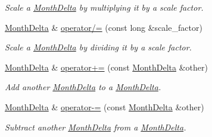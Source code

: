 \begin{DoxyCompactItemize}
\begin{DoxyCompactList}\small\item\em Scale a \hyperlink{structMonthDelta}{Month\-Delta} by multiplying it by a scale factor. \end{DoxyCompactList}\item 
\hyperlink{structMonthDelta}{Month\-Delta} \& \hyperlink{structMonthDelta_a1c88e61ee94308ced34e8d73d13bc383}{operator/=} (const long \&scale\-\_\-factor)
\begin{DoxyCompactList}\small\item\em Scale a \hyperlink{structMonthDelta}{Month\-Delta} by dividing it by a scale factor. \end{DoxyCompactList}\item 
\hyperlink{structMonthDelta}{Month\-Delta} \& \hyperlink{structMonthDelta_aa244bc614894a3daaf8d71f0c9c6202b}{operator+=} (const \hyperlink{structMonthDelta}{Month\-Delta} \&other)
\begin{DoxyCompactList}\small\item\em Add another \hyperlink{structMonthDelta}{Month\-Delta} to a \hyperlink{structMonthDelta}{Month\-Delta}. \end{DoxyCompactList}\item 
\hyperlink{structMonthDelta}{Month\-Delta} \& \hyperlink{structMonthDelta_ad62de2e3686f5b93088eb371e9ff4c87}{operator-\/=} (const \hyperlink{structMonthDelta}{Month\-Delta} \&other)
\begin{DoxyCompactList}\small\item\em Subtract another \hyperlink{structMonthDelta}{Month\-Delta} from a \hyperlink{structMonthDelta}{Month\-Delta}. \end{DoxyCompactList}\end{DoxyCompactItemize}
